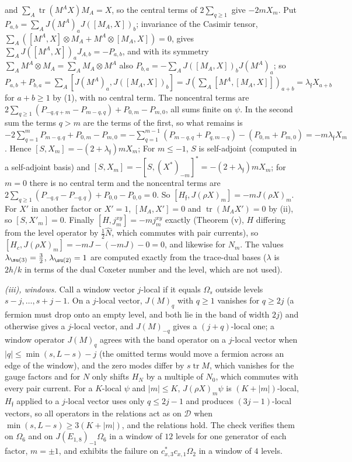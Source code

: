and $\sum_{A}\operatorname{tr}(M^{A}X)M_{A} = X$, so the central terms of $2\sum_{q \ge 1}$ give $-2mX_{m}$. Put $P_{a,b} = \sum_{A}J(M^{A})_{a}J([M_{A}, X])_{b}$; invariance of the Casimir tensor, $\sum_{A}([M^{A}, X]\otimes M_{A} + M^{A}\otimes[M_{A}, X]) = 0$, gives $\sum_{A}J([M^{A}, X])_{a}J_{A,b} = -P_{a,b}$, and with its symmetry $\sum_{A}M^{A}\otimes M_{A} = \sum_{A}M_{A}\otimes M^{A}$ also $P_{b,a} = -\sum_{A}J([M_{A}, X])_{b}J(M^{A})_{a}$; so $P_{a,b} + P_{b,a} = \sum_{A}[J(M^{A})_{a}, J([M_{A}, X])_{b}] = J(\sum_{A}[M^{A}, [M_{A}, X]])_{a+b} = \lambda_{\mathfrak{f}}X_{a+b}$ for $a + b \ge 1$ by (1), with no central term. The noncentral terms are $2\sum_{q \ge 1}(P_{-q,q+m} - P_{m-q,q}) + P_{0,m} - P_{m,0}$, all sums finite on $\psi$. In the second sum the terms $q > m$ are the terms of the first, so what remains is $-2\sum_{q=1}^{m}P_{m-q,q} + P_{0,m} - P_{m,0} = -\sum_{q=1}^{m-1}(P_{m-q,q} + P_{q,m-q}) - (P_{0,m} + P_{m,0}) = -m\lambda_{\mathfrak{f}}X_{m}$. Hence $[S, X_{m}] = -(2 + \lambda_{\mathfrak{f}})mX_{m}$; For $m \le -1$, $S$ is self-adjoint (computed in a self-adjoint basis) and $[S, X_{m}] = -[S, (X^{*})_{-m}]^{*} = -(2 + \lambda_{\mathfrak{f}})mX_{m}$; for $m = 0$ there is no central term and the noncentral terms are $2\sum_{q \ge 1}(P_{-q,q} - P_{-q,q}) + P_{0,0} - P_{0,0} = 0$. So $[H_{\mathfrak{f}}, J(\rho X)_{m}] = -mJ(\rho X)_{m}$. For $X'$ in another factor or $X' = 1$, $[M_{A}, X'] = 0$ and $\operatorname{tr}(M_{A}X') = 0$ by (ii), so $[S, X'_{m}] = 0$. Finally $[H, j^{xy}_{m}] = -mj^{xy}_{m}$ exactly (Theorem (v), $H$ differing from the level operator by $\tfrac12\hat N$, which commutes with pair currents), so $[H_{c}, J(\rho X)_{m}] = -m J - (-m J) - 0 = 0$, and likewise for $N_{m}$. The values $\lambda_{\su(3)} = \tfrac32$, $\lambda_{\su(2)} = 1$ are computed exactly from the trace-dual bases ($\lambda$ is $2h/k$ in terms of the dual Coxeter number and the level, which are not used).

\emph{(iii), windows.} Call a window vector $j$-local if it equals $\Omega_{s}$ outside levels $s - j, \dots, s + j - 1$. On a $j$-local vector, $J(M)_{q}$ with $q \ge 1$ vanishes for $q \ge 2j$ (a fermion must drop onto an empty level, and both lie in the band of width $2j$) and otherwise gives a $j$-local vector, and $J(M)_{-q}$ gives a $(j + q)$-local one; a window operator $J(M)_{q}$ agrees with the band operator on a $j$-local vector when $|q| \le \min(s, L - s) - j$ (the omitted terms would move a fermion across an edge of the window), and the zero modes differ by $s\operatorname{tr}M$, which vanishes for the gauge factors and for $N$ only shifts $H_{N}$ by a multiple of $N_{0}$, which commutes with every pair current. For a $K$-local $\psi$ and $|m| \le K$, $J(\rho X)_{m}\psi$ is $(K + |m|)$-local, $H_{\mathfrak{f}}$ applied to a $j$-local vector uses only $q \le 2j - 1$ and produces $(3j - 1)$-local vectors, so all operators in the relations act as on $\mathcal{D}$ when $\min(s, L - s) \ge 3(K + |m|)$, and the relations hold. The check verifies them on $\Omega_{6}$ and on $J(E_{1,8})_{-1}\Omega_{6}$ in a window of $12$ levels for one generator of each factor, $m = \pm1$, and exhibits the failure on $c^{*}_{x,3}c_{x,1}\Omega_{2}$ in a window of $4$ levels.


